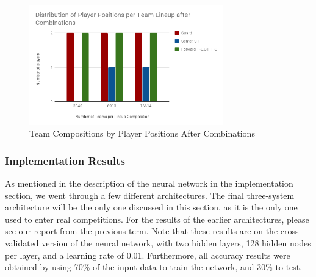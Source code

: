 \begin{figure}[ht]
    \centering
    \includegraphics[width=0.75\textwidth]{figures/distributionAfterCombination}
    \caption{Team Compositions by Player Positions After Combinations}
    \label{fig:distributionAfterCombination}
\end{figure}

\subsubsection{Implementation Results}
As mentioned in the description of the neural network in the implementation section, we went through a few different architectures. The final three-system architecture will be the only one discussed in this section, as it is the only one used to enter real competitions. For the results of the earlier architectures, please see our report from the previous term.  Note that these results are on the cross-validated version of the neural network, with two hidden layers, 128 hidden nodes per layer, and a learning rate of 0.01. Furthermore, all accuracy results were obtained by using 70\% of the input data to train the network, and 30\% to test.\\

